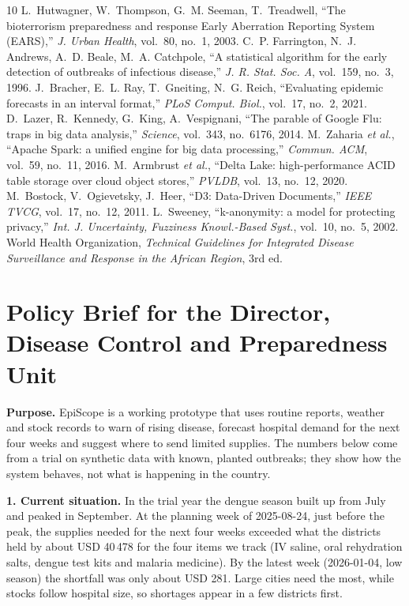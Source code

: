 \documentclass[conference]{IEEEtran}
\begin{document}
\begin{thebibliography}{10}
 L.~Hutwagner, W.~Thompson, G.~M. Seeman, T.~Treadwell, ``The bioterrorism preparedness and response Early Aberration Reporting System (EARS),'' \emph{J. Urban Health}, vol.~80, no.~1, 2003.
 C.~P. Farrington, N.~J. Andrews, A.~D. Beale, M.~A. Catchpole, ``A statistical algorithm for the early detection of outbreaks of infectious disease,'' \emph{J. R. Stat. Soc. A}, vol.~159, no.~3, 1996.
 J.~Bracher, E.~L. Ray, T.~Gneiting, N.~G. Reich, ``Evaluating epidemic forecasts in an interval format,'' \emph{PLoS Comput. Biol.}, vol.~17, no.~2, 2021.
 D.~Lazer, R.~Kennedy, G.~King, A.~Vespignani, ``The parable of Google Flu: traps in big data analysis,'' \emph{Science}, vol.~343, no.~6176, 2014.
 M.~Zaharia \emph{et al.}, ``Apache Spark: a unified engine for big data processing,'' \emph{Commun. ACM}, vol.~59, no.~11, 2016.
 M.~Armbrust \emph{et al.}, ``Delta Lake: high-performance ACID table storage over cloud object stores,'' \emph{PVLDB}, vol.~13, no.~12, 2020.
 M.~Bostock, V.~Ogievetsky, J.~Heer, ``D3: Data-Driven Documents,'' \emph{IEEE TVCG}, vol.~17, no.~12, 2011.
 L.~Sweeney, ``k-anonymity: a model for protecting privacy,'' \emph{Int. J. Uncertainty, Fuzziness Knowl.-Based Syst.}, vol.~10, no.~5, 2002.
 World Health Organization, \emph{Technical Guidelines for Integrated Disease Surveillance and Response in the African Region}, 3rd ed.
\end{thebibliography}

\appendices
\section{Policy Brief for the Director, Disease Control and Preparedness Unit}\label{app:brief}
\textbf{Purpose.} EpiScope is a working prototype that uses routine reports, weather and stock records to warn of rising disease, forecast hospital demand for the next four weeks and suggest where to send limited supplies. The numbers below come from a trial on synthetic data with known, planted outbreaks; they show how the system behaves, not what is happening in the country.

\textbf{1. Current situation.} In the trial year the dengue season built up from July and peaked in September. At the planning week of 2025-08-24, just before the peak, the supplies needed for the next four weeks exceeded what the districts held by about USD 40\,478 for the four items we track (IV saline, oral rehydration salts, dengue test kits and malaria medicine). By the latest week (2026-01-04, low season) the shortfall was only about USD 281. Large cities need the most, while stocks follow hospital size, so shortages appear in a few districts first.
\end{document}
